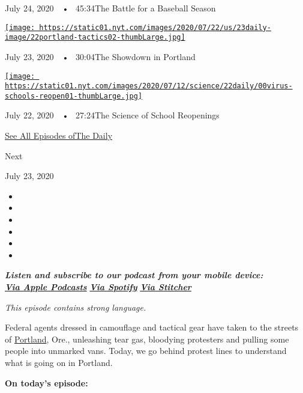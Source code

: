 July 24, 2020~~•~ 45:34The Battle for a Baseball Season

\href{https://www.nytimes.com/2020/07/23/podcasts/the-daily/portland-protests.html?action=click\&module=audio-series-bar\&region=header\&pgtype=Article}{\texttt{[image: https://static01.nyt.com/images/2020/07/22/us/23daily-image/22portland-tactics02-thumbLarge.jpg]}}

July 23, 2020~~•~ 30:04The Showdown in Portland

\href{https://www.nytimes.com/2020/07/22/podcasts/the-daily/school-reopenings-coronavirus.html?action=click\&module=audio-series-bar\&region=header\&pgtype=Article}{\texttt{[image: https://static01.nyt.com/images/2020/07/12/science/22daily/00virus-schools-reopen01-thumbLarge.jpg]}}

July 22, 2020~~•~ 27:24The Science of School Reopenings

\href{https://www.nytimes.com/column/the-daily}{See All Episodes ofThe
Daily}

Next

July 23, 2020

\begin{itemize}
\item
\item
\item
\item
\item
\item
\end{itemize}

\emph{\textbf{Listen and subscribe to our podcast from your mobile
device:}}\\
\textbf{\href{https://itunes.apple.com/us/podcast/the-daily/id1200361736?mt=2}{\emph{Via
Apple Podcasts}}} \emph{\textbf{\textbar{}}}
\textbf{\href{https://open.spotify.com/show/3IM0lmZxpFAY7CwMuv9H4g?si=SfuMSC55R1qprFsRZU3_zw}{\emph{Via
Spotify}}} \emph{\textbf{\textbar{}}}
\textbf{\href{http://www.stitcher.com/podcast/the-new-york-times/the-daily-10}{\emph{Via
Stitcher}}}

\emph{This episode contains strong language.}

Federal agents dressed in camouflage and tactical gear have taken to the
streets of
\href{https://www.nytimes.com/2020/07/23/upshot/trump-portland.html}{Portland},
Ore., unleashing tear gas, bloodying protesters and pulling some people
into unmarked vans. Today, we go behind protest lines to understand what
is going on in Portland.

\textbf{On today's episode:}

